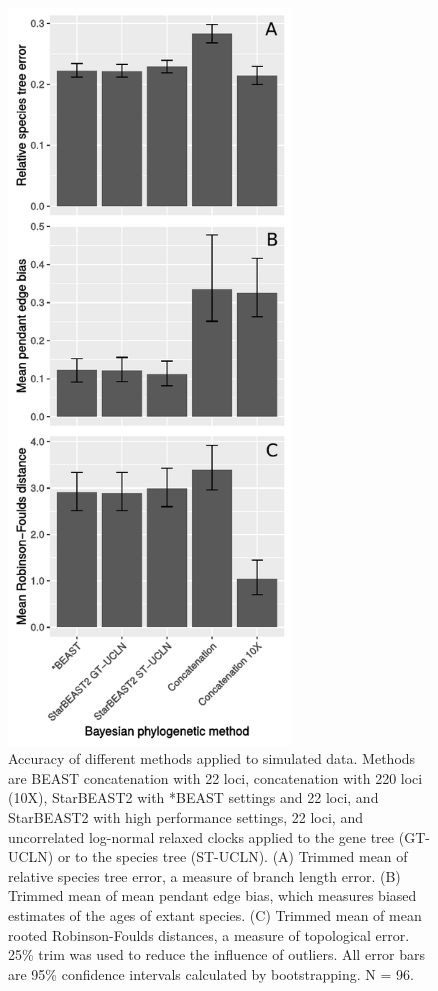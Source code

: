 \documentclass[nogrid]{MBE}%
\begin{document}
\begin{figure}[htb!]
\centering
\includegraphics[width=7.5cm]{tree_error.pdf}
\caption
{Accuracy of different methods applied to simulated data. Methods are BEAST concatenation with 22 loci, concatenation with 220 loci
(10X), StarBEAST2 with *BEAST settings and 22 loci, and StarBEAST2 with
high performance settings, 22 loci, and uncorrelated log-normal relaxed clocks applied
to the gene tree (GT-UCLN) or to the species tree (ST-UCLN). (A) Trimmed mean of
relative species tree error, a measure of branch length error. (B) Trimmed
mean of mean pendant edge bias, which measures biased estimates of the ages of
extant species. (C) Trimmed mean of mean rooted Robinson-Foulds distances, a
measure of topological error. 25\% trim was used to reduce the
influence of outliers. All error bars are 95\% confidence intervals calculated
by bootstrapping. N = 96.}
\label{fig:speciesTreeError}
\end{figure}
\end{document}

